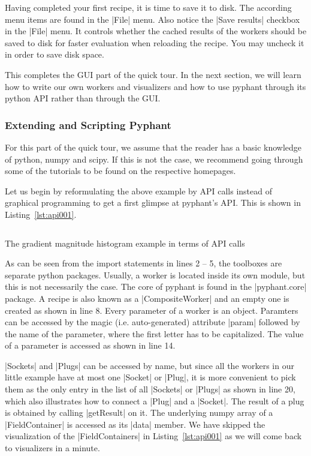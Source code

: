 \documentclass[a4paper]{article}
\begin{document}
Having completed your first recipe, it is time to save it to
disk. The according menu items are found in the |File| menu. Also
notice the |Save results| checkbox in the |File| menu. It controls
whether the cached results of the workers should be saved to disk for
faster evaluation when reloading the recipe. You may uncheck it in
order to save disk space.

This completes the GUI part of the quick tour. In the next section, we
will learn how to write our own workers and visualizers and how to use
pyphant through its python API rather than through the GUI.

\FloatBarrier
\subsubsection{Extending and Scripting Pyphant}
\label{sec:introduction_extending_and_scripting}

For this part of the quick tour, we assume that the reader has a basic
knowledge of python\cite{python}, numpy\cite{numpy} and
scipy\cite{scipy}. If this is not the case, we recommend going through
some of the tutorials to be found on the respective homepages.

Let us begin by reformulating the above example by API calls instead
of graphical programming to get a first glimpse at pyphant's API. This
is shown in Listing~\ref{lst:api001}.

\begin{listing}[h]
  \inputminted[linenos]{python}{api001.py}
  \caption{The gradient magnitude histogram example in terms of API
    calls}
  \label{lst:api001}
\end{listing}

As can be seen from the import statements in lines 2 -- 5, the
toolboxes are separate python packages. Usually, a worker is located
inside its own module, but this is not necessarily the case. The core
of pyphant is found in the |pyphant.core| package. A recipe is also
known as a |CompositeWorker| and an empty one is created as shown in
line 8. Every parameter of a worker is an object. Paramters can be
accessed by the magic (i.e. auto-generated) attribute |param| followed
by the name of the parameter, where the first letter has to be
capitalized. The value of a parameter is accessed as shown in line 14.

|Sockets| and |Plugs| can be accessed by name, but since all the
workers in our little example have at most one |Socket| or |Plug|, it
is more convenient to pick them as the only entry in the list of all
|Sockets| or |Plugs| as shown in line 20, which also illustrates how
to connect a |Plug| and a |Socket|. The result of a plug is obtained
by calling |getResult| on it. The underlying numpy array of a
|FieldContainer| is accessed as its |data| member. We have skipped the
visualization of the |FieldContainers| in Listing~\ref{lst:api001} as
we will come back to visualizers in a minute.
\end{document}
